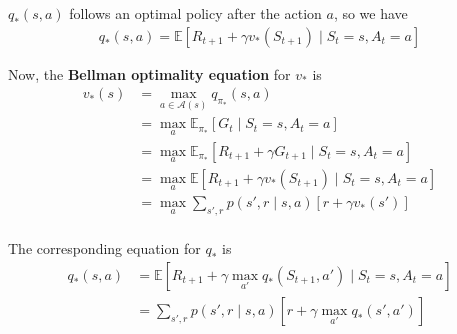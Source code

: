 \documentclass[a4paper,11pt,reqno]{amsart}
\begin{document}
$q_*(s, a)$ follows an optimal policy after the action $a$, so we have
\begin{align}
q_{*}(s, a) = \mathbb{E}\left[ R_{t+1} + \gamma v_{*}(S_{t+1}) \mid S_{t}=s, A_{t} = a \right] 
\end{align}

Now, the \textbf{Bellman optimality equation} for $v_{*}$ is
\begin{align}
    v_{*}(s) &= \max_{a \in \mathcal{A}(s)}q_{\pi _{*}}(s, a) \\
    &= \max_{a}\mathbb{E}_{\pi _{*}}\left[ G_t \mid S_t = s, A_t = a \right]  \\
    &= \max_{a} \mathbb{E}_{\pi _{*}}\left[ R_{t + 1} + \gamma G_{t+1} \mid S_t = s, A_t = a \right]  \\
    &= \max_{a}\mathbb{E}\left[ R_{t+1} + \gamma v_{*}(S_{t+1}) \mid S_t = s, A_t = a \right]  \\
    &= \max_{a}\sum_{s', r} p(s', r \mid s, a) \left[ r + \gamma v_{*}(s') \right]  \\
\end{align}

The corresponding equation for $q_{*}$ is 
\begin{align}
    q_{*}(s, a) &= \mathbb{E}\left[ R_{t+1} + \gamma \max_{a'}q_{*}(S_{t+1}, a') \;\Big | \; S_t = s, A_t = a \right] \\
    &= \sum_{s', r} p(s', r \mid s, a)\left[ r + \gamma \max_{a'}q_{*}(s', a') \right]  
\end{align}
\end{document}
